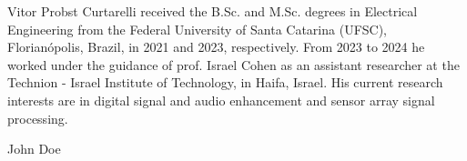 \begin{minipage}{\linewidth}
	\begin{IEEEbiography}{Vitor Probst Curtarelli}
		received the B.Sc. and M.Sc. degrees in Electrical Engineering from the Federal University of Santa Catarina (UFSC), Florianópolis, Brazil, in 2021 and 2023, respectively. From 2023 to 2024 he worked under the guidance of prof. Israel Cohen as an assistant researcher at the Technion - Israel Institute of Technology, in Haifa, Israel. His current research interests are in digital signal and audio enhancement and sensor array signal processing.
	\end{IEEEbiography}
	
	\vspace{11pt}
	
	\begin{IEEEbiography}{John Doe}
		\lipsum[2]
	\end{IEEEbiography}
\end{minipage}